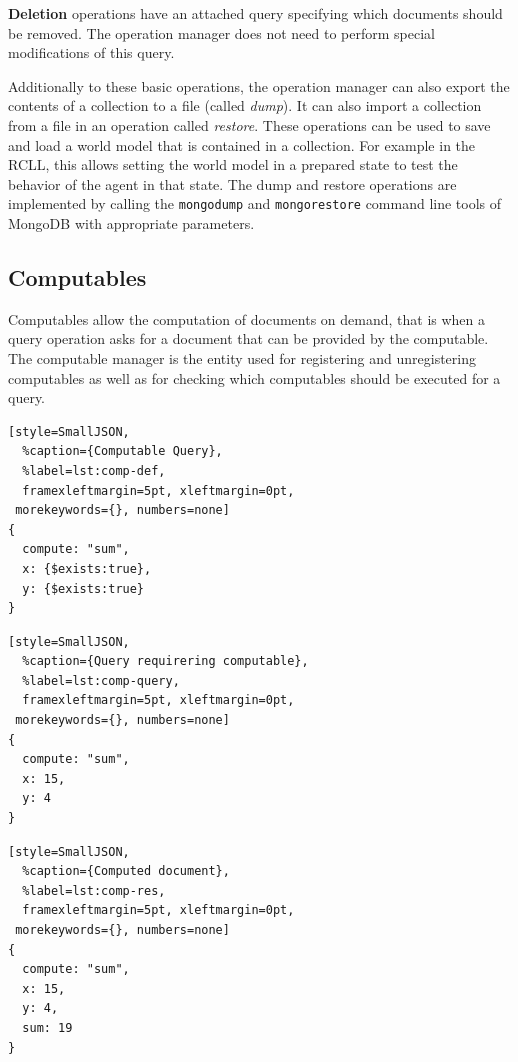 \textbf{Deletion} operations have an attached query specifying which
documents should be removed. The operation manager does not need to
perform special modifications of this query.

Additionally to these basic operations, the operation manager can also
export the contents of a collection to a file (called \emph{dump}). It
can also import a collection from a file in an operation called
\emph{restore}. These operations can be used to save and load a world
model that is contained in a collection. For example in the RCLL, this
allows setting the world model in a prepared state to test the
behavior of the agent in that state. The dump and restore operations
are implemented by calling the \texttt{mongodump} and
\texttt{mongorestore} command line tools of MongoDB with appropriate
parameters.

\subsection{Computables}
\label{sec:impl-computables}
Computables allow the computation of documents on demand, that is when
a query operation asks for a document that can be provided by the
computable. The computable manager is the entity used for registering
and unregistering computables as well as for checking which
computables should be executed for a query.\\
\begin{listing}
\addtocounter{lstlisting}{1}
\noindent
\begin{minipage}[b]{.30\textwidth}
\begin{lstlisting}[style=SmallJSON,
  %caption={Computable Query},
  %label=lst:comp-def,
  framexleftmargin=5pt, xleftmargin=0pt,
 morekeywords={}, numbers=none]
{
  compute: "sum",
  x: {$exists:true},
  y: {$exists:true}
}
\end{lstlisting}
\end{minipage}%
\hfill
\begin{minipage}[b]{.25\textwidth}
\begin{lstlisting}[style=SmallJSON,
  %caption={Query requirering computable},
  %label=lst:comp-query,
  framexleftmargin=5pt, xleftmargin=0pt,
 morekeywords={}, numbers=none]
{
  compute: "sum",
  x: 15,
  y: 4
}
\end{lstlisting}
\end{minipage}%
\hfill
\begin{minipage}[b]{.25\textwidth}
\begin{lstlisting}[style=SmallJSON,
  %caption={Computed document},
  %label=lst:comp-res,
  framexleftmargin=5pt, xleftmargin=0pt,
 morekeywords={}, numbers=none]
{
  compute: "sum",
  x: 15,
  y: 4,
  sum: 19
}
\end{lstlisting}
  \vspace{-0.3cm}
  \vspace{0.3cm}
\end{minipage}%
\caption{Queries and documents involved in a computable for addition}
\label{lst:comp}
\end{listing}

